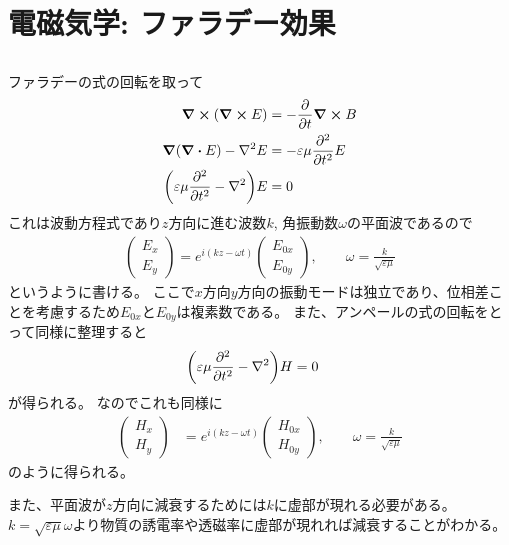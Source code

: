 \documentclass[../../master.tex]{subfiles}
\begin{document}
\chapter{電磁気学: ファラデー効果}
\section{}
ファラデーの式の回転を取って
\begin{align}
    \curl(\curl E) &= -\pdv{t} \curl B\\
    \grad(\div E) - \laplacian{E} &= -\varepsilon\mu \pdv[2]{t}E\\
    \qty(\varepsilon\mu\pdv[2]{t}-\laplacian)E &= 0
\end{align}
これは波動方程式であり\(z\)方向に進む波数\(k\), 角振動数\(\omega\)の平面波であるので
\begin{align}
    \begin{pmatrix}
        E_x\\ E_y
    \end{pmatrix}
    = e^{i(kz-\omega t)}\begin{pmatrix}
        E_{0x} \\
        E_{0y}
    \end{pmatrix},\qquad
    \omega = \frac{k}{\sqrt{\varepsilon\mu}}
\end{align}
というように書ける。
ここで\(x\)方向\(y\)方向の振動モードは独立であり、位相差ことを考慮するため\(E_{0x}\)と\(E_{0y}\)は複素数である。
また、アンペールの式の回転をとって同様に整理すると
\begin{align}
    \qty(\varepsilon\mu\pdv[2]{t}-\laplacian)H &= 0
\end{align}
が得られる。
なのでこれも同様に
\begin{align}
    \begin{pmatrix}
        H_x\\ H_y
    \end{pmatrix}
    &= e^{i(kz-\omega t)}\begin{pmatrix}
        H_{0x} \\
        H_{0y}
    \end{pmatrix},\qquad
    \omega = \frac{k}{\sqrt{\varepsilon\mu}}
\end{align}
のように得られる。

また、平面波が\(z\)方向に減衰するためには\(k\)に虚部が現れる必要がある。
\(k=\sqrt{\varepsilon\mu}\omega\)より物質の誘電率や透磁率に虚部が現れれば減衰することがわかる。
\end{document}
